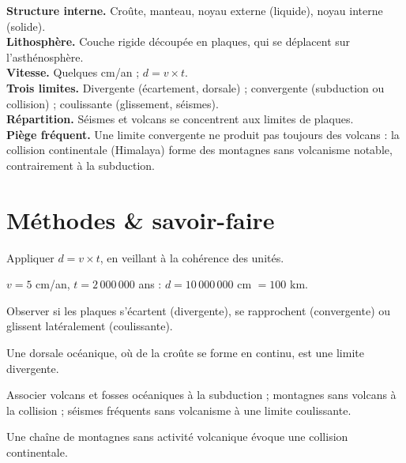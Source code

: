 \begin{synthese}
\textbf{Structure interne.} Croûte, manteau, noyau externe (liquide), noyau interne
(solide).\\[4pt]
\textbf{Lithosphère.} Couche rigide découpée en plaques, qui se déplacent sur
l'asthénosphère.\\[4pt]
\textbf{Vitesse.} Quelques cm/an ; $d=v\times t$.\\[4pt]
\textbf{Trois limites.} Divergente (écartement, dorsale) ; convergente (subduction ou
collision) ; coulissante (glissement, séismes).\\[4pt]
\textbf{Répartition.} Séismes et volcans se concentrent aux limites de plaques.\\[4pt]
\textbf{Piège fréquent.} Une limite convergente ne produit pas toujours des volcans : la
collision continentale (Himalaya) forme des montagnes sans volcanisme notable, contrairement
à la subduction.
\end{synthese}

\section{Méthodes \& savoir-faire}

Appliquer $d=v\times t$, en veillant à la cohérence des unités.
\begin{exemple}
$v=5$ cm/an, $t=2\,000\,000$ ans : $d=10\,000\,000$ cm $=100$ km.
\end{exemple}

Observer si les plaques s'écartent (divergente), se rapprochent (convergente) ou
glissent latéralement (coulissante).
\begin{exemple}
Une dorsale océanique, où de la croûte se forme en continu, est une limite divergente.
\end{exemple}

Associer volcans et fosses océaniques à la subduction ; montagnes sans volcans à la
collision ; séismes fréquents sans volcanisme à une limite coulissante.
\begin{exemple}
Une chaîne de montagnes sans activité volcanique évoque une collision continentale.
\end{exemple}


